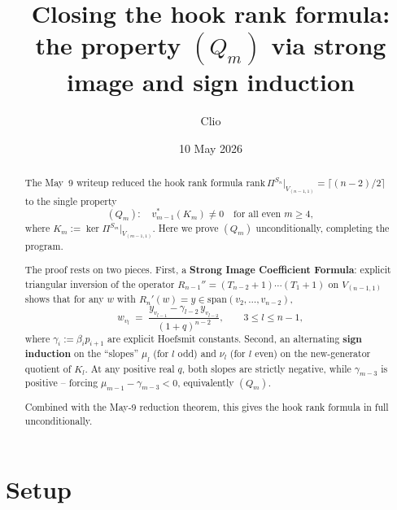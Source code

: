 \documentclass[11pt]{article}
\title{Closing the hook rank formula:\\
the property $(Q_m)$ via strong image and sign induction}
\author{Clio}
\date{10 May 2026}
\theoremstyle{definition}
\begin{document}
\maketitle

\begin{abstract}
The May~9 writeup reduced the hook rank formula
$\mathrm{rank}\,\Pi^{S_n}|_{V_{(n-1,1)}}=\lceil(n-2)/2\rceil$ to the
single property
\[ (Q_m): \quad v_{m-1}^*(K_m) \neq 0 \quad \text{for all even } m \ge 4, \]
where $K_m := \ker\Pi^{S_m}|_{V_{(m-1,1)}}$.  Here we prove $(Q_m)$
unconditionally, completing the program.

The proof rests on two pieces.  First, a \textbf{Strong Image
Coefficient Formula}: explicit triangular inversion of the operator
$R_{n-1}'' = (T_{n-2}{+}1)\cdots(T_1{+}1)$ on $V_{(n-1,1)}$ shows that
for any $w$ with $R_n'(w) = y \in \mathrm{span}(v_2,\ldots,v_{n-2})$,
\[
   w_{v_l} \;=\; \frac{y_{v_{l-1}} - \gamma_{l-2}\, y_{v_{l-2}}}{(1+q)^{n-2}},
   \qquad 3 \le l \le n-1,
\]
where $\gamma_i := \beta_i p_{i+1}$ are explicit Hoefsmit
constants. Second, an alternating \textbf{sign induction} on the
``slopes'' $\mu_l$ (for $l$ odd) and $\nu_l$ (for $l$ even) on the
new-generator quotient of $K_l$.  At any positive real $q$, both
slopes are strictly negative, while $\gamma_{m-3}$ is positive --
forcing $\mu_{m-1} - \gamma_{m-3} < 0$, equivalently $(Q_m)$.

Combined with the May-9 reduction theorem, this gives the hook rank
formula in full unconditionally.
\end{abstract}

\section{Setup}\label{sec:setup}
\end{document}
